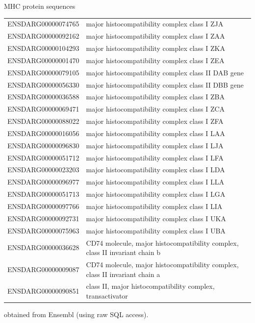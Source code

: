\documentclass[pdf]{beamer}
\begin{document}
\begin{frame}{MHC protein sequences}
  \tiny{
  \begin{tabular}{ ll }
    ENSDARG00000074765  &    major histocompatibility complex class I ZJA \\
    ENSDARG00000092162   &   major histocompatibility complex class I ZAA \\
    ENSDARG00000104293   &   major histocompatibility complex class I ZKA \\
    ENSDARG00000001470    &  major histocompatibility complex class I ZEA \\
    ENSDARG00000079105   &   major histocompatibility complex class II DAB gene \\
    ENSDARG00000056330   &   major histocompatibility complex class II DBB gene \\
    ENSDARG00000036588   &   major histocompatibility complex class I ZBA \\ 
    ENSDARG00000069471  &    major histocompatibility complex class I ZCA \\
    ENSDARG00000088022   &   major histocompatibility complex class I ZFA \\
    ENSDARG00000016056   &   major histocompatibility complex class I LAA \\
    ENSDARG00000096830  &    major histocompatibility complex class I LJA \\
    ENSDARG00000051712   &   major histocompatibility complex class I LFA \\
    ENSDARG00000023203   &   major histocompatibility complex class I LDA \\
    ENSDARG00000096977   &   major histocompatibility complex class I LLA \\
    ENSDARG00000051713   &   major histocompatibility complex class I LGA \\
    ENSDARG00000097766   &   major histocompatibility complex class I LIA \\
    ENSDARG00000092731   &   major histocompatibility complex class I UKA \\
    ENSDARG00000075963  &    major histocompatibility complex class I UBA \\
    ENSDARG00000036628   &   CD74 molecule, major histocompatibility complex,
    class II invariant chain b \\
    ENSDARG00000009087    &  CD74 molecule, major histocompatibility complex, class
    II invariant chain a  \\
    ENSDARG00000090851   &   class II, major histocompatibility complex,
    transactivator  \\
  \end{tabular}
  }
  
  obtained from Ensembl (using raw SQL access).
\end{frame}
\end{document}
